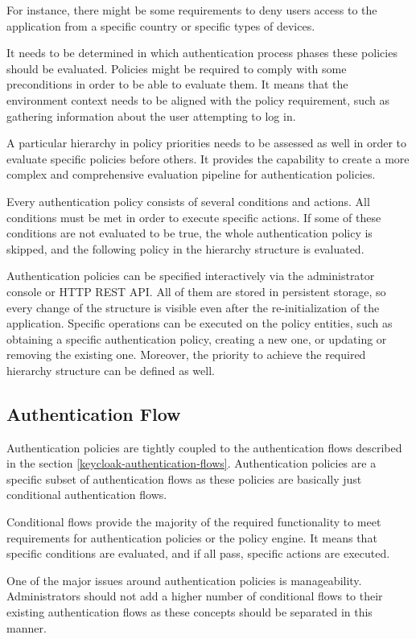 For instance, there might be some requirements to deny users access to the application from a specific country or specific types of devices.

It needs to be determined in which authentication process phases these policies should be evaluated.
Policies might be required to comply with some preconditions in order to be able to evaluate them.
It means that the environment context needs to be aligned with the policy requirement, such as gathering information about the user attempting to log in.

A particular hierarchy in policy priorities needs to be assessed as well in order to evaluate specific policies before others.
It provides the capability to create a more complex and comprehensive evaluation pipeline for authentication policies.

Every authentication policy consists of several conditions and actions.
All conditions must be met in order to execute specific actions.
If some of these conditions are not evaluated to be true, the whole authentication policy is skipped, and the following policy in the hierarchy structure is evaluated.

Authentication policies can be specified interactively via the administrator console or HTTP REST API.
All of them are stored in persistent storage, so every change of the structure is visible even after the re-initialization of the application. 
Specific operations can be executed on the policy entities, such as obtaining a specific authentication policy, creating a new one, or updating or removing the existing one.
Moreover, the priority to achieve the required hierarchy structure can be defined as well.

\subsection{Authentication Flow}

Authentication policies are tightly coupled to the authentication flows described in the section \ref{keycloak-authentication-flows}.
Authentication policies are a specific subset of authentication flows as these policies are basically just conditional authentication flows.

Conditional flows provide the majority of the required functionality to meet requirements for authentication policies or the policy engine.
It means that specific conditions are evaluated, and if all pass, specific actions are executed.

One of the major issues around authentication policies is manageability.
Administrators should not add a higher number of conditional flows to their existing authentication flows as these concepts should be separated in this manner.

